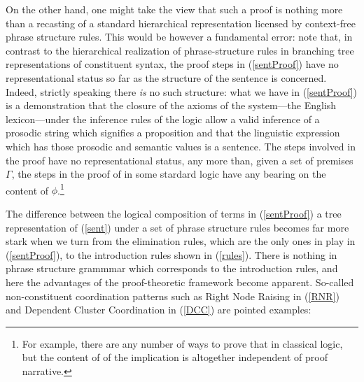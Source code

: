 \documentclass[output=paper,colorlinks,citecolor=brown]{langscibook}
\begin{document}
On the other hand, one might take the view that such a proof is
nothing more than a recasting of a standard hierarchical
representation licensed by context-free phrase structure rules. This
would be however a fundamental error: note that, in contrast to the
hierarchical realization of phrase-structure rules in branching tree
representations of constituent syntax, the proof steps in (\ref{sentProof})
have no representational status so far as the structure of the
sentence is concerned. Indeed, strictly speaking there \textit{is} no
such structure: what we have in (\ref{sentProof}) is a demonstration that
the closure of the axioms of the system---the English lexicon---under
the inference rules of the logic allow a valid inference of a prosodic
string
which signifies a proposition
 and that the
linguistic expression which has those prosodic and semantic values is
a sentence. The steps involved in the proof have no representational
status, any more than, given a set of premises $\Gamma$, the steps in
the proof of \sem{ \Gamma  \ensuremath{\vdash\xspace } \phi } in some stardard logic have any
bearing on the content of $\phi$.\footnote{For example, there are any
number of ways to prove that \sem{  \ensuremath{\vdash\xspace } \phi\supset(\neg\phi\supset\psi) }
in classical logic, but the content of of the implication is
altogether independent of proof narrative.}

The difference between the logical composition of terms in (\ref{sentProof})
a tree representation of (\ref{sent}) under a set of phrase structure rules
becomes far more stark when we turn from the elimination rules, which
are the only ones in play in (\ref{sentProof}), to the introduction rules
shown in (\ref{rules}). There is nothing in phrase structure grammmar which
corresponds to the introduction rules, and here the advantages of the
proof-theoretic framework become apparent. So-called non-constituent
coordination patterns such as Right Node Raising in (\ref{RNR}) and
Dependent Cluster Coordination in (\ref{DCC}) are pointed examples:
\end{document}
